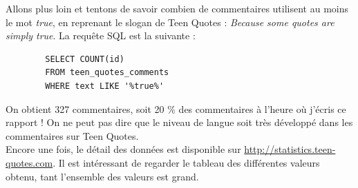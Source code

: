 \documentclass{report}
\begin{document}
	Allons plus loin et tentons de savoir combien de commentaires utilisent au moins le mot \textit{true}, en reprenant le slogan de Teen Quotes : \textit{Because some quotes are simply true}. La requête SQL est la suivante :
	\begin{lstlisting}
		SELECT COUNT(id) 
		FROM teen_quotes_comments
		WHERE text LIKE '%true%'
	\end{lstlisting}
	On obtient 327 commentaires, soit 20 \% des commentaires à l'heure où j'écris ce rapport ! On ne peut pas dire que le niveau de langue soit très développé dans les commentaires sur Teen Quotes.\\
		
	Encore une fois, le détail des données est disponible sur \url{http://statistics.teen-quotes.com}. Il est intéressant de regarder le tableau des différentes valeurs obtenu, tant l'ensemble des valeurs est grand.
	

\end{document}
